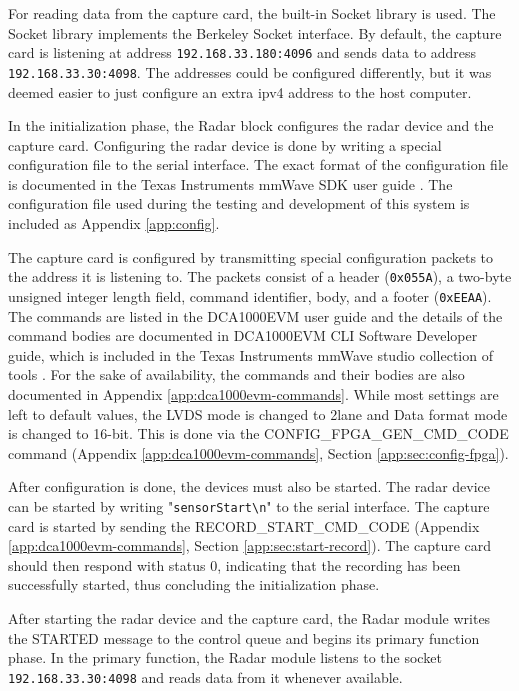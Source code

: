 For reading data from the capture card, the built-in Socket library is used.
The Socket library implements the Berkeley Socket interface.
By default, the capture card is listening at address \texttt{192.168.33.180:4096} and sends data to address \texttt{192.168.33.30:4098}.
The addresses could be configured differently, but it was deemed easier to just configure an extra \gls{ipv4} address to the host computer. \cite{dca1000-user-guide}

In the initialization phase, the Radar block configures the radar device and the capture card.
Configuring the radar device is done by writing a special configuration file to the serial interface.
The exact format of the configuration file is documented in the Texas Instruments mmWave SDK user guide \cite{mmwave-sdk-user-guide}.
The configuration file used during the testing and development of this system is included as Appendix \ref{app:config}.

The capture card is configured by transmitting special configuration packets to the address it is listening to.
The packets consist of a header (\texttt{0x055A}), a two-byte unsigned integer length field, command identifier, body, and a footer (\texttt{0xEEAA}).
The commands are listed in the DCA1000EVM user guide \cite{dca1000-user-guide} and the details of the command bodies are documented in 
DCA1000EVM CLI Software Developer guide, which is included in the Texas Instruments mmWave studio collection of tools \cite{mmwave-studio}.
For the sake of availability, the commands and their bodies are also documented in Appendix \ref{app:dca1000evm-commands}.
While most settings are left to default values, the LVDS mode is changed to 2lane and Data format mode is changed to 16-bit.
This is done via the CONFIG\_FPGA\_GEN\_CMD\_CODE command (Appendix \ref{app:dca1000evm-commands}, Section \ref{app:sec:config-fpga}).

After configuration is done, the devices must also be started.
The radar device can be started by writing "\texttt{sensorStart\textbackslash n}" to the serial interface.
The capture card is started by sending the RECORD\_START\_CMD\_CODE (Appendix \ref{app:dca1000evm-commands}, Section \ref{app:sec:start-record}).
The capture card should then respond with status 0, indicating that the recording has been successfully started,
thus concluding the initialization phase.

After starting the radar device and the capture card,
the Radar module writes the STARTED message to the control queue and begins its primary function phase.
In the primary function,
the Radar module listens to the socket \texttt{192.168.33.30:4098} and reads data from it whenever available.

